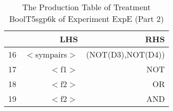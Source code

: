 \begin{table}[ht]
\centering
\begin{tabular}{rrr}
  \hline
 & LHS & RHS \\ 
  \hline
16 & $<$sympairs$>$ & (NOT(D3),NOT(D4)) \\ 
  17 & $<$f1$>$ & NOT \\ 
  18 & $<$f2$>$ & OR \\ 
  19 & $<$f2$>$ & AND \\ 
   \hline
\end{tabular}
\caption{The Production Table of Treatment BoolT5sgp6k of Experiment ExpE (Part 2)} 
\end{table}
